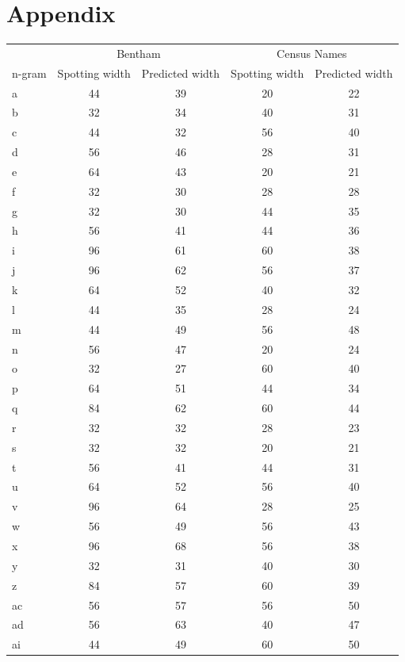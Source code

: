 \documentclass[ms,electronic,twosidetoc,letterpaper,chaptercenter,parttop,lof,lot]{byumsphd}
\begin{document}
\chapter{Appendix}
\singlespacing
\begin{longtable}{| l | c c | c c |}
  \hline
  & \multicolumn{2}{c|}{Bentham} & \multicolumn{2}{c|}{Census Names}\\
  n-gram & Spotting width & Predicted width & Spotting width & Predicted width \\
  \hline
    a & 44 & 39 & 20 & 22 \\
  b & 32 & 34 & 40 & 31 \\
  c & 44 & 32 & 56 & 40 \\
  d & 56 & 46 & 28 & 31 \\
  e & 64 & 43 & 20 & 21 \\
  f & 32 & 30 & 28 & 28 \\
  g & 32 & 30 & 44 & 35 \\
  h & 56 & 41 & 44 & 36 \\
  i & 96 & 61 & 60 & 38 \\
  j & 96 & 62 & 56 & 37 \\
  k & 64 & 52 & 40 & 32 \\
  l & 44 & 35 & 28 & 24 \\
  m & 44 & 49 & 56 & 48 \\
  n & 56 & 47 & 20 & 24 \\
  o & 32 & 27 & 60 & 40 \\
  p & 64 & 51 & 44 & 34 \\
  q & 84 & 62 & 60 & 44 \\
  r & 32 & 32 & 28 & 23 \\
  s & 32 & 32 & 20 & 21 \\
  t & 56 & 41 & 44 & 31 \\
  u & 64 & 52 & 56 & 40 \\
  v & 96 & 64 & 28 & 25 \\
  w & 56 & 49 & 56 & 43 \\
  x & 96 & 68 & 56 & 38 \\
  y & 32 & 31 & 40 & 30 \\
  z & 84 & 57 & 60 & 39 \\
  ac & 56 & 57 & 56 & 50 \\
  ad & 56 & 63 & 40 & 47 \\
  ai & 44 & 49 & 60 & 50 \\

\end{longtable}
\end{document}
